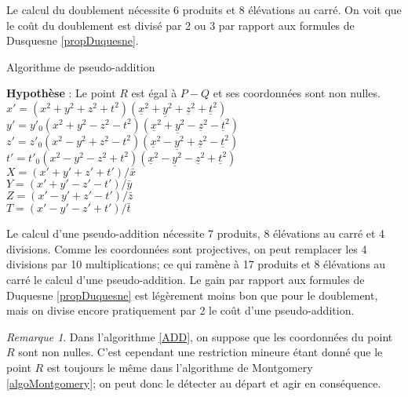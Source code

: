 \documentclass[a4paper]{article}
\theoremstyle{definition}
\theoremstyle{remark}
\newtheorem{remarque}{Remarque}
\numberwithin{equation}{section}
\begin{document}
Le calcul du doublement nécessite 6 produits et 8 élévations au carré. On voit que le coût du doublement est divisé par 2 ou 3 par rapport aux formules de Dusquesne \ref{propDuquesne}.

\begin{algorithm}
\label{ADD}
\caption{Algorithme de pseudo-addition}
\textbf{Hypothèse} : Le point $R$ est égal à $P-Q$ et ses coordonnées sont non nulles. \\
$x' = (x^2 + y^2 + z^2 + t^2)(\underline{x}^2 + \underline{y}^2 + \underline{z}^2 + \underline{t}^2)$ \\
$y' = y'_0(x^2 + y^2 - z^2 - t^2)(\underline{x}^2 + \underline{y}^2 - \underline{z}^2 - \underline{t}^2)$ \\
$z' = z'_0(x^2 - y^2 + z^2 - t^2)(\underline{x}^2 - \underline{y}^2 + \underline{z}^2 - \underline{t}^2)$ \\
$t' = t'_0(x^2 - y^2 - z^2 + t^2)(\underline{x}^2 - \underline{y}^2 - \underline{z}^2 + \underline{t}^2)$ \\
$X = (x' + y' + z' + t')/\bar{x}$ \\
$Y = (x' + y' - z' - t')/\bar{y}$ \\
$Z = (x' - y' + z' - t')/\bar{z}$ \\
$T = (x' - y' - z' + t')/\bar{t}$ \\
\end{algorithm}

Le calcul d'une pseudo-addition nécessite 7 produits, 8 élévations au carré et 4 divisions. Comme les coordonnées sont projectives, on peut remplacer les 4 divisions par 10 multiplications; ce qui ramène à 17 produits et 8 élévations au carré le calcul d'une pseudo-addition. Le gain par rapport aux formules de Duquesne \ref{propDuquesne} est légèrement moins bon que pour le doublement, mais on divise encore pratiquement par 2 le coût d'une pseudo-addition.

\begin{remarque}
Dans l'algorithme \ref{ADD}, on suppose que les coordonnées du point $R$ sont non nulles. C'est cependant une restriction mineure étant donné que le point $R$ est toujours le même dans l'algorithme de Montgomery \ref{algoMontgomery}; on peut donc le détecter au départ et agir en conséquence.
\end{remarque}
\end{document}
